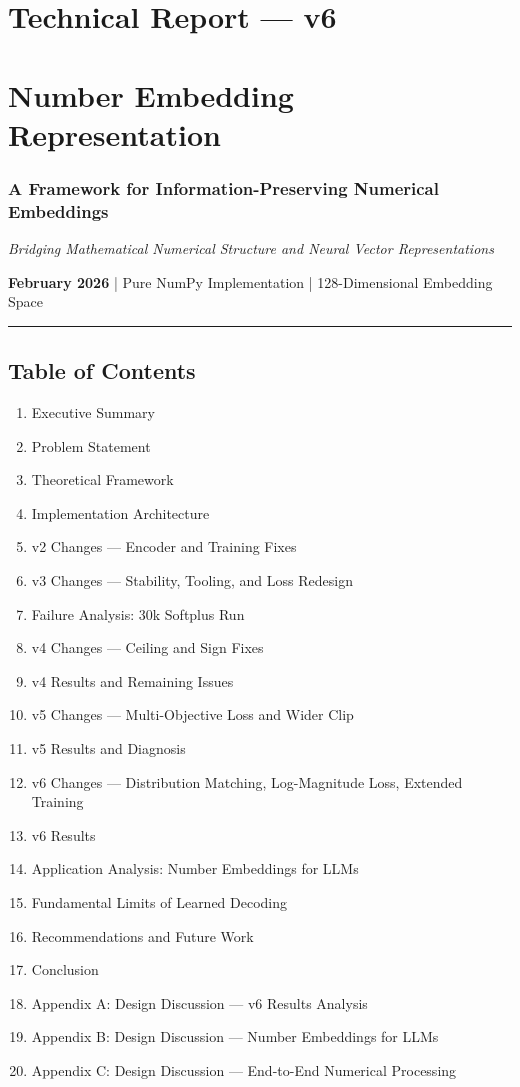 \documentclass[11pt]{article}
\begin{document}
\section*{Technical Report — v6}

\section*{Number Embedding Representation}

\subsubsection*{A Framework for Information-Preserving Numerical Embeddings}


\emph{Bridging Mathematical Numerical Structure and Neural Vector Representations}


\textbf{February 2026} | Pure NumPy Implementation | 128-Dimensional Embedding Space


\noindent\rule{\textwidth}{0.4pt}


\subsection*{Table of Contents}


\begin{enumerate}
\item Executive Summary
\item Problem Statement
\item Theoretical Framework
\item Implementation Architecture
\item v2 Changes — Encoder and Training Fixes
\item v3 Changes — Stability, Tooling, and Loss Redesign
\item Failure Analysis: 30k Softplus Run
\item v4 Changes — Ceiling and Sign Fixes
\item v4 Results and Remaining Issues
\item v5 Changes — Multi-Objective Loss and Wider Clip
\item v5 Results and Diagnosis
\item v6 Changes — Distribution Matching, Log-Magnitude Loss, Extended Training
\item v6 Results
\item Application Analysis: Number Embeddings for LLMs
\item Fundamental Limits of Learned Decoding
\item Recommendations and Future Work
\item Conclusion
\item Appendix A: Design Discussion — v6 Results Analysis
\item Appendix B: Design Discussion — Number Embeddings for LLMs
\item Appendix C: Design Discussion — End-to-End Numerical Processing
\end{enumerate}
\end{document}
